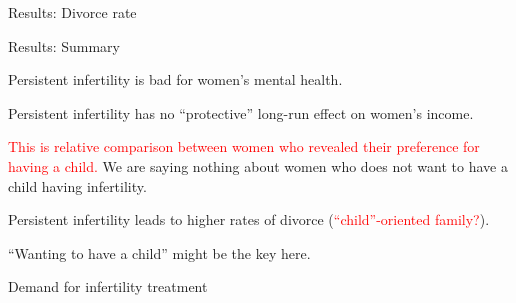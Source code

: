 \documentclass[notes,11pt, aspectratio=169]{beamer}
\newenvironment{wideitemize}{\itemize\addtolength{\itemsep}{0.4em}}{\enditemize}
\begin{document}
\begin{frame}{Results: Divorce rate}

	\begin{figure}
	\end{figure}

\end{frame}

\begin{frame}{Results: Summary}
\begin{wideitemize}
	\item Persistent infertility is bad for women's mental health.
	\item Persistent infertility has no ``protective'' long-run effect on women's income.
	\item \textcolor{red}{This is relative comparison between women who revealed their preference for having a child.} We are saying nothing about women who does not want to have a child having infertility.
	\item Persistent infertility leads to higher rates of divorce (\textcolor{red}{``child''-oriented family?}).
	\item ``Wanting to have a child'' might be the key here.

\end{wideitemize}	
\end{frame}

\begin{frame}
	\begin{center}
		\huge{Demand for infertility treatment}
	\end{center}
\end{frame}
\end{document}
